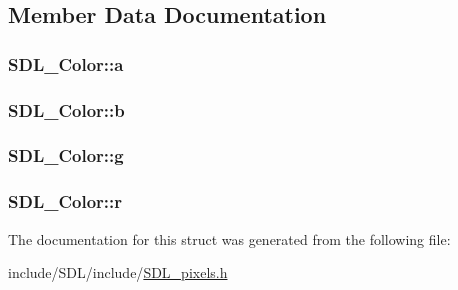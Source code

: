 \subsection{Member Data Documentation}
\hypertarget{struct_s_d_l___color_ac497ba67af6ecb4d51bdd0945b314526}{
\subsubsection[{a}]{ S\-D\-L\-\_\-\-Color\-::a}}\label{struct_s_d_l___color_ac497ba67af6ecb4d51bdd0945b314526}
\hypertarget{struct_s_d_l___color_a3b79a27e0414049559aa5bcf241dedd3}{
\subsubsection[{b}]{ S\-D\-L\-\_\-\-Color\-::b}}\label{struct_s_d_l___color_a3b79a27e0414049559aa5bcf241dedd3}
\hypertarget{struct_s_d_l___color_ae29d881bf740cfa7078b36e07f85d298}{
\subsubsection[{g}]{ S\-D\-L\-\_\-\-Color\-::g}}\label{struct_s_d_l___color_ae29d881bf740cfa7078b36e07f85d298}
\hypertarget{struct_s_d_l___color_a0bb975b6829524133fdd3c6060cfa63d}{
\subsubsection[{r}]{ S\-D\-L\-\_\-\-Color\-::r}}\label{struct_s_d_l___color_a0bb975b6829524133fdd3c6060cfa63d}


The documentation for this struct was generated from the following file\-:\begin{DoxyCompactItemize}
\item 
include/\-S\-D\-L/include/\hyperlink{_s_d_l__pixels_8h}{S\-D\-L\-\_\-pixels.\-h}\end{DoxyCompactItemize}
